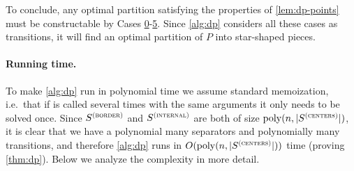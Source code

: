 \documentclass[10pt,a4paper]{article}
\newcommand\Scen{S^{\textsc{(centers)}}}
\newcommand\Sint{S^{\textsc{(internal)}}}
\newcommand\Sbor{S^{\textsc{(border)}}}
\newcommand\poly{\mathrm{poly}}
\begin{document}
To conclude, any optimal partition satisfying the properties of \cref{lem:dp-points} must be constructable by Cases \hyperref[itm:case0]{0}-\hyperref[itm:case5]{5}. Since \cref{alg:dp} considers all these cases as transitions, it will find an optimal partition of $P$ into star-shaped pieces.

\paragraph{Running time.}
To make \cref{alg:dp} run in polynomial time we assume standard memoization, i.e.\ that if \FMain is called several times with the same arguments it only needs to be solved once. Since $\Sbor$ and $\Sint$ are both of size $\poly(n,|\Scen|)$, it is clear that we have a polynomial many separators and polynomially many transitions, and therefore \cref{alg:dp} runs in $O(\poly(n,|\Scen|))$ time (proving \cref{thm:dp}). Below we analyze the complexity in more detail. 
\end{document}
